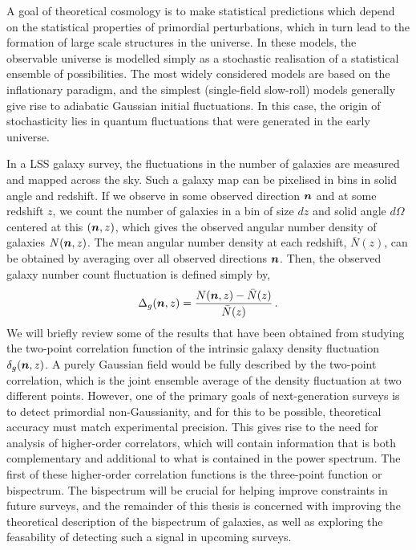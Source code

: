 A goal of theoretical cosmology is to make statistical predictions which depend on the statistical properties of primordial perturbations, which in turn lead to the formation of large scale structures in the universe. In these models, the observable universe is modelled simply as a stochastic realisation of a statistical ensemble of possibilities. The most widely considered models are based on the inflationary paradigm, and the simplest (single-field slow-roll) models generally give rise to adiabatic Gaussian initial fluctuations. In this case, the origin of stochasticity lies in quantum fluctuations that were generated in the early universe. 

In a LSS galaxy survey, the fluctuations in the number of galaxies are measured and mapped across the sky. Such a galaxy map can be pixelised in bins in solid angle and redshift. If we observe in some observed direction $\bm {n}$ and at some redshift $z$, we count the number of galaxies in a bin of size $dz$ and solid angle $d\Omega$ centered at this $(\bm {n},z)$, which gives the observed angular number density of galaxies $N(\bm {n},z)$. The mean angular number density at each redshift, $\bar{N}(z)$, can be obtained by averaging over all observed directions $\bm {n}$. 
 Then, the observed galaxy number count fluctuation is defined simply by, 
\begin{equation}
	\Delta_g(\bm {n},z) = \frac{N(\bm {n},z) - \bar{N}(z)}{\bar{N}(z)}\,.
\end{equation}
We will briefly review some of the results that have been obtained from studying the two-point correlation function of the intrinsic galaxy density fluctuation $\delta_g(\bm {n},z)$. A purely Gaussian field would be fully described by the two-point correlation, which is the joint ensemble average of the density fluctuation at two different points. However, one of the primary goals of next-generation surveys is to detect primordial non-Gaussianity, and for this to be possible, theoretical accuracy must match experimental precision. This gives rise to the need for analysis of higher-order correlators, which will contain information that is both complementary and additional to what is contained in the power spectrum. The first of these higher-order correlation functions is the three-point function or bispectrum. The bispectrum will be crucial for helping improve constraints in future surveys, and the remainder of this thesis is concerned with improving the theoretical description of the bispectrum of galaxies, as well as exploring the feasability of detecting such a signal in upcoming surveys.


